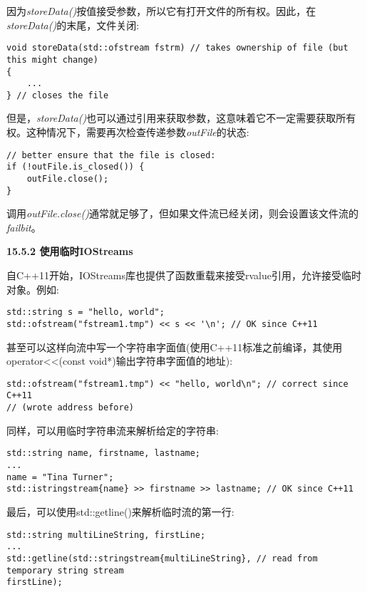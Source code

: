 因为\textit{storeData()}按值接受参数，所以它有打开文件的所有权。因此，在\textit{storeData()}的末尾，文件关闭:\par

\begin{lstlisting}[caption={}]
void storeData(std::ofstream fstrm) // takes ownership of file (but this might change)
{
	...
} // closes the file
\end{lstlisting}

但是，\textit{storeData()}也可以通过引用来获取参数，这意味着它不一定需要获取所有权。这种情况下，需要再次检查传递参数\textit{outFile}的状态:\par

\begin{lstlisting}[caption={}]
// better ensure that the file is closed:
if (!outFile.is_closed()) {
	outFile.close();
}
\end{lstlisting}

调用\textit{outFile.close()}通常就足够了，但如果文件流已经关闭，则会设置该文件流的\textit{failbit}。\par

\hspace*{\fill} \par %
\textbf{15.5.2 使用临时IOStreams}

自C++11开始，IOStreams库也提供了函数重载来接受rvalue引用，允许接受临时对象。例如:\par

\begin{lstlisting}[caption={}]
std::string s = "hello, world";
std::ofstream("fstream1.tmp") << s << '\n'; // OK since C++11
\end{lstlisting}

甚至可以这样向流中写一个字符串字面值(使用C++11标准之前编译，其使用operator<<(const void*)输出字符串字面值的地址):\par

\begin{lstlisting}[caption={}]
std::ofstream("fstream1.tmp") << "hello, world\n"; // correct since C++11
// (wrote address before)
\end{lstlisting}

同样，可以用临时字符串流来解析给定的字符串:\par

\begin{lstlisting}[caption={}]
std::string name, firstname, lastname;
...
name = "Tina Turner";
std::istringstream{name} >> firstname >> lastname; // OK since C++11
\end{lstlisting}

最后，可以使用std::getline()来解析临时流的第一行:\par

\begin{lstlisting}[caption={}]
std::string multiLineString, firstLine;
...
std::getline(std::stringstream{multiLineString}, // read from temporary string stream
firstLine);
\end{lstlisting}



























